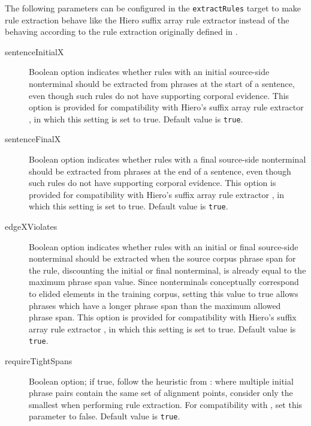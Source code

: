 \documentclass{pbml}
\newcommand{\newcite}{\namecite}
\begin{document}
The following parameters can be configured in the {\tt extractRules} target to make rule extraction behave like the Hiero suffix array rule extractor {\protect \cite{Lopez2008} } instead of the behaving according to the rule extraction originally defined in {\protect \newcite{Chiang2005}}.

\begin{description}

	\item[sentenceInitialX] Boolean option indicates whether rules with an initial source-side nonterminal should be extracted from phrases at the start of a sentence, even though such rules do not have supporting corporal evidence. This option is provided for compatibility with Hiero's suffix array rule extractor \cite{Lopez2008}, in which this setting is set to true. Default value is {\tt true}.

	\item[sentenceFinalX] Boolean option indicates whether rules with a final source-side nonterminal should be extracted from phrases at the end of a sentence, even though such rules do not have supporting corporal evidence. This option is provided for compatibility with Hiero's suffix array rule extractor \cite{Lopez2008}, in which this setting is set to true. Default value is {\tt true}.

	\item[edgeXViolates] Boolean option indicates whether rules with an initial or final source-side nonterminal should be extracted when the source corpus phrase span for the rule, discounting the initial or final nonterminal, is already equal to the maximum phrase span value. Since nonterminals conceptually correspond to elided elements in the training corpus, setting this value to true allows phrases which have a longer phrase span than the maximum allowed phrase span. This option is provided for compatibility with Hiero's suffix array rule extractor \cite{Lopez2008}, in which this setting is set to true. Default value is {\tt true}.

	\item[requireTightSpans] Boolean option; if true, follow the heuristic from \cite{Chiang2005}: where multiple initial phrase pairs contain the same set of alignment points, consider only the smallest when performing rule extraction. For compatibility with \newcite{Lopez2008}, set this parameter to false. Default value is {\tt true}.

\end{description}
\end{document}
